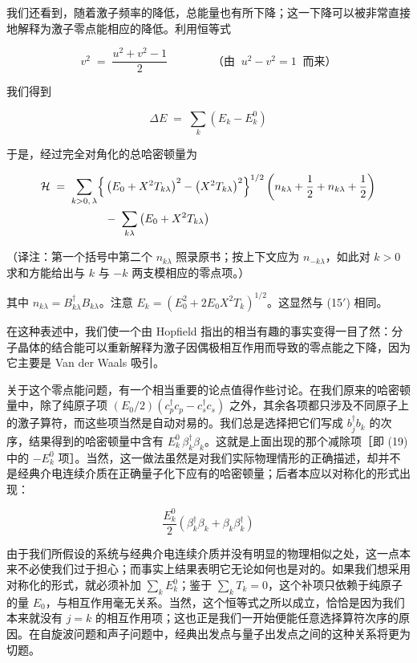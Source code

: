 我们还看到，随着激子频率的降低，总能量也有所下降；这一下降可以被非常直接地解释为激子零点能相应的降低。利用恒等式

\begin{equation*}
v^{2} \;=\; \frac{u^{2} + v^{2} - 1}{2} \qquad\qquad \text{（由}\;\; u^{2} - v^{2} = 1\;\;\text{而来）}
\end{equation*}

我们得到

\begin{equation*}
\Delta E \;=\; \sum_{k}\left(E_k - E_k^{0}\right) \tag{19}
\end{equation*}

于是，经过完全对角化的总哈密顿量为

\begin{align*}
\mathcal{H} \;=\; \sum_{k>0,\,\lambda} \Bigl\{ & \left(E_0 + X^{2}T_{k\lambda}\right)^{2} - \left(X^{2}T_{k\lambda}\right)^{2}\Bigr\}^{1/2} \left(n_{k\lambda} + \frac{1}{2} + n_{k\lambda} + \frac{1}{2}\right) \\
& -\;\sum_{k\lambda}\left(E_0 + X^{2}T_{k\lambda}\right)
\end{align*}

（译注：第一个括号中第二个 $n_{k\lambda}$ 照录原书；按上下文应为 $n_{-k\lambda}$，如此对 $k>0$ 求和方能给出与 $k$ 与 $-k$ 两支模相应的零点项。）

其中 $n_{k\lambda} = B_{k\lambda}^{\dagger}B_{k\lambda}$。注意 $E_k = \left(E_0^{2} + 2E_0 X^{2}T_k\right)^{1/2}$。这显然与 (15$'$) 相同。

在这种表述中，我们使一个由 Hopfield 指出的相当有趣的事实变得一目了然：分子晶体的结合能可以重新解释为激子因偶极相互作用而导致的零点能之下降，因为它主要是 Van der Waals 吸引。

关于这个零点能问题，有一个相当重要的论点值得作些讨论。在我们原来的哈密顿量中，除了纯原子项 $(E_0/2)\left(c_p^{\dagger}c_p - c_s^{\dagger}c_s\right)$ 之外，其余各项都只涉及不同原子上的激子算符，而这些项当然是自动对易的。我们总是选择把它们写成 $b_j^{\dagger}b_k$ 的次序，结果得到的哈密顿量中含有 $E_k^{0}\,\beta_k^{\dagger}\beta_k$。这就是上面出现的那个减除项［即 (19) 中的 $-E_k^{0}$ 项］。当然，这一做法虽然是对我们实际物理情形的正确描述，却并不是经典介电连续介质在正确量子化下应有的哈密顿量；后者本应以对称化的形式出现：

\begin{equation*}
\frac{E_k^{0}}{2}\left(\beta_k^{\dagger}\beta_k + \beta_k\beta_k^{\dagger}\right)
\end{equation*}

由于我们所假设的系统与经典介电连续介质并没有明显的物理相似之处，这一点本来不必使我们过于担心；而事实上结果表明它无论如何也是对的。如果我们想采用对称化的形式，就必须补加 $\sum_k E_k^{0}$；鉴于 $\sum_k T_k = 0$，这个补项只依赖于纯原子的量 $E_0$，与相互作用毫无关系。当然，这个恒等式之所以成立，恰恰是因为我们本来就没有 $j=k$ 的相互作用项；这也正是我们一开始便能任意选择算符次序的原因。在自旋波问题和声子问题中，经典出发点与量子出发点之间的这种关系将更为切题。

